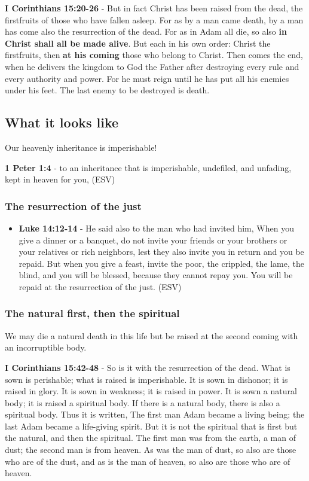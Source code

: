 \documentclass[11pt]{article}
\begin{document}
\textbf{I Corinthians 15:20-26} - But in fact Christ has been raised from the dead, the firstfruits of those who have fallen asleep.  For as by a man came death, by a man has come also the resurrection of the dead.  For as in Adam all die, so also \textbf{in Christ shall all be made alive}.  But each in his own order: Christ the firstfruits, then \textbf{at his coming} those who belong to Christ.  Then comes the end, when he delivers the kingdom to God the Father after destroying every rule and every authority and power.  For he must reign until he has put all his enemies under his feet.  The last enemy to be destroyed is death.

\subsection{What it looks like}
\label{sec:org95bee37}
Our heavenly inheritance is imperishable!

\textbf{1 Peter 1:4} -  to an inheritance that is imperishable, undefiled, and unfading, kept in heaven for you,  (ESV)

\subsubsection{The resurrection of the just}
\label{sec:orgc70ef47}
\begin{itemize}
\item \textbf{Luke 14:12-14} - He said also to the man who had invited him, When you give a dinner or a banquet, do not invite your friends or your brothers or your relatives or rich neighbors, lest they also invite you in return and you be repaid. But when you give a feast, invite the poor, the crippled, the lame, the blind, and you will be blessed, because they cannot repay you. You will be repaid at the resurrection of the just. (ESV)
\end{itemize}

\subsubsection{The natural first, then the spiritual}
\label{sec:orgbb46e9c}
We may die a natural death in this life but be raised at the second coming with an incorruptible body.

\textbf{I Corinthians 15:42-48} - So is it with the resurrection of the dead. What is sown is perishable; what is raised is imperishable.  It is sown in dishonor; it is raised in glory. It is sown in weakness; it is raised in power.  It is sown a natural body; it is raised a spiritual body. If there is a natural body, there is also a spiritual body.  Thus it is written, The first man Adam became a living being; the last Adam became a life-giving spirit.  But it is not the spiritual that is first but the natural, and then the spiritual.  The first man was from the earth, a man of dust; the second man is from heaven.  As was the man of dust, so also are those who are of the dust, and as is the man of heaven, so also are those who are of heaven.
\end{document}
